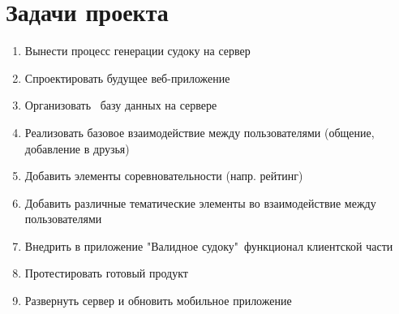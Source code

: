 \documentclass{article}
\begin{document}
\section*{Задачи проекта}

\begin{enumerate}
    \item Вынести процесс генерации судоку на сервер
    \item Спроектировать будущее веб-приложение
    \item Организовать  базу данных на сервере
    \item Реализовать базовое взаимодействие между пользователями (общение, добавление в друзья)
    \item Добавить элементы соревновательности (напр. рейтинг)
    \item Добавить различные тематические элементы во взаимодействие между пользователями
    \item Внедрить в приложение "Валидное судоку"\ функционал клиентской части
    \item Протестировать готовый продукт
    \item Развернуть сервер и обновить мобильное приложение
\end{enumerate}
\end{document}
